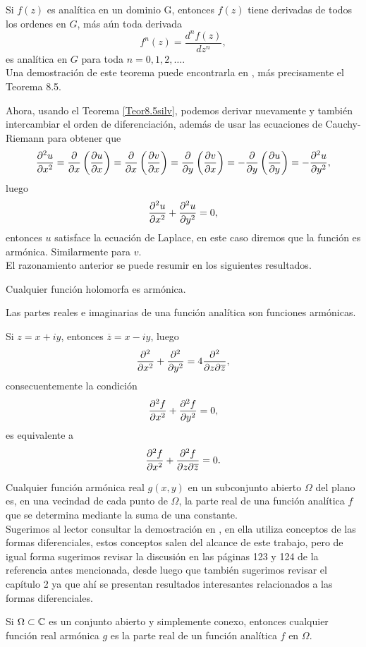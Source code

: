 \begin{teor}\label{Teor8.5silv}
	Si $f(z)$ es analítica en un dominio G, entonces $f(z)$ tiene derivadas de todos los ordenes en $G$, más aún toda derivada $$f^{n}(z)=\dfrac{d^n f(z)}{dz^n},$$ es analítica en $G$ para toda $n=0,1,2,\ldots$.\\
	Una demostración de este teorema puede encontrarla en \cite{silverman}, más precisamente el Teorema 8.5. 
\end{teor}
Ahora, usando el Teorema \ref{Teor8.5silv}, podemos derivar nuevamente y también intercambiar el orden de diferenciación, además de usar las ecuaciones de Cauchy-Riemann para obtener que
$$\dfrac{\partial^2 u}{\partial x^2}=\dfrac{\partial}{\partial x}\left(\dfrac{\partial u}{\partial x}\right)=\dfrac{\partial}{\partial x}\left(\dfrac{\partial v}{\partial x}\right)=\dfrac{\partial}{\partial y}\left(\dfrac{\partial v}{\partial x}\right)=-\dfrac{\partial}{\partial y}\left(\dfrac{\partial u}{\partial y}\right)=-\dfrac{\partial^2u}{\partial y^2},$$
luego
$$\dfrac{\partial^2 u}{\partial x^2}+\dfrac{\partial^2u}{\partial y^2}=0,$$
entonces $u$ satisface la ecuación de Laplace, en este caso diremos que la función es armónica. Similarmente para $v$.\\
El razonamiento anterior se puede resumir en los siguientes resultados. 
\begin{prop}
	Cualquier función holomorfa es armónica.
\end{prop}
\begin{coro}
	Las partes reales e imaginarias de una función analítica son funciones armónicas.
\end{coro}
Si $z=x+iy$, entonces $\overline{z}=x-iy$, luego $$\dfrac{\partial^2}{\partial x^2}+\dfrac{\partial^2}{\partial y^2}=4\dfrac{\partial^2}{\partial z\partial \overline{z}},$$
consecuentemente la condición 
\begin{equation}\label{ecarmonica1}
	\dfrac{\partial^2 f}{\partial x^2}+\dfrac{\partial^2 f}{\partial y^2}=0,
\end{equation}
es equivalente a 
\begin{equation}\label{ecarmonica2}
	\dfrac{\partial^2 f}{\partial x^2}+\dfrac{\partial^2 f}{\partial z\partial\overline{z}}=0.
\end{equation}

\begin{prop}
	Cualquier función armónica real $g(x,y)$ en un subconjunto abierto $\Omega$ del plano es, en una vecindad de cada punto de $\Omega$, la parte real de una función analítica $f$ que se determina mediante la suma de una constante.\\
	Sugerimos al lector consultar la demostración en \cite{cartan}, en ella utiliza conceptos de las formas diferenciales, estos conceptos salen del alcance de este trabajo, pero de igual forma sugerimos revisar la discusión en las páginas 123 y 124 de la referencia antes mencionada, desde luego que también sugerimos revisar el capítulo 2 ya que ahí se presentan resultados interesantes relacionados a las formas diferenciales.
\end{prop}
\begin{coro}\label{coroarmo}
	Si $\Omega\subset\mathbb{C}$ es un conjunto abierto y simplemente conexo, entonces cualquier función real armónica $g$ es la parte real de un función analítica $f$ en $\Omega$.  
\end{coro}
